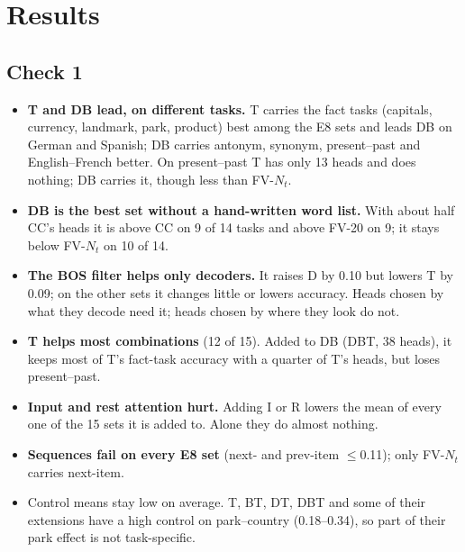 \documentclass[10pt,a4paper]{article}
\begin{document}
\section{Results}

\subsection{Check 1}

\begin{table}[H]\centering\small
\resizebox{\linewidth}{!}{}
\caption{Check 1, task accuracy at the cross-fitted $\alpha$, mean of the two folds; the main E8 sets and the references (E7 raw $+$F; E4's CC-20, CC, FV-20, FV-$N_t$), all cross-fitted over $\alpha$ 1 and 2. Items: patched items in fold 1/2. Control mean: accuracy with the control task's mean. All 31 sets per task: Table~\ref{tab:all1}.}
\label{tab:check1}
\end{table}

\begin{table}[H]\centering\small

\caption{Every set, mean over the 14 tasks, task and control mean in both checks, sorted by check 1; heads: median over tasks; tasks: tasks with a non-empty set.}
\label{tab:overview}
\end{table}

\begin{itemize}
\item \textbf{T and DB lead, on different tasks.} T carries the fact tasks (capitals, currency, landmark, park, product) best among the E8 sets and leads DB on German and Spanish; DB carries antonym, synonym, present--past and English--French better. On present--past T has only 13 heads and does nothing; DB carries it, though less than FV-$N_t$.
\item \textbf{DB is the best set without a hand-written word list.} With about half CC's heads it is above CC on 9 of 14 tasks and above FV-20 on 9; it stays below FV-$N_t$ on 10 of 14.
\item \textbf{The BOS filter helps only decoders.} It raises D by 0.10 but lowers T by 0.09; on the other sets it changes little or lowers accuracy. Heads chosen by what they decode need it; heads chosen by where they look do not.
\item \textbf{T helps most combinations} (12 of 15). Added to DB (DBT, 38 heads), it keeps most of T's fact-task accuracy with a quarter of T's heads, but loses present--past.
\item \textbf{Input and rest attention hurt.} Adding I or R lowers the mean of every one of the 15 sets it is added to. Alone they do almost nothing.
\item \textbf{Sequences fail on every E8 set} (next- and prev-item $\leq$0.11); only FV-$N_t$ carries next-item.
\item Control means stay low on average. T, BT, DT, DBT and some of their extensions have a high control on park--country (0.18--0.34), so part of their park effect is not task-specific.
\end{itemize}
\end{document}
